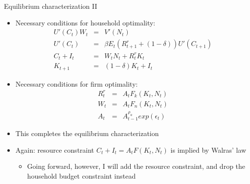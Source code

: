 \documentclass[9pt,xcolor={dvipsnames}]{beamer}
\newcommand{\bit}{\begin{itemize}}
\newcommand{\eit}{\end{itemize}}
\newcommand{\bc}{\color{blue}}
\begin{document}
\begin{frame}{Equilibrium characterization II}

\bit
\setlength\itemsep{1.5em}

\item Necessary conditions for household optimality:
\begin{eqnarray}
U'(C_t)W_t &=& V'(N_t) \nonumber \\
U'(C_t) &=& \beta E_t(R^{r}_{t+1}+(1-\delta)) U'(C_{t+1}) \nonumber \\
C_t + I_t &=& W_t N_t + R^{r}_tK_t \nonumber \\
K_{t+1} &=& (1-\delta) K_t + I_t \nonumber
\end{eqnarray}

\item Necessary conditions for firm optimality:
\begin{eqnarray}
R^{r}_t &=& A_t F_k (K_t, N_t) \nonumber \\
W_t &=& A_t F_n (K_t, N_t) \nonumber \\
A_t &=& A_{t-1}^{\rho_a}exp(\epsilon_t) \nonumber
\end{eqnarray}

\item This completes the equilibrium characterization

\item Again: resource constraint $C_t + I_t = A_t F(K_t, N_t)$ is implied by Walras' law
\bit
\setlength\itemsep{0.5em}
	\item Going forward, however, I will add the resource constraint, and drop the household budget constraint instead
\eit

\eit

\end{frame}
%
%
%
%
%
\end{document}
